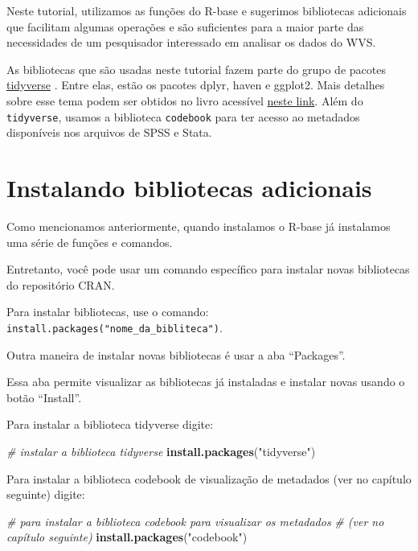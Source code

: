 \documentclass[
  10pt,
  brazil,
  a4paper,
  twoside, notitlepage, openright]{book}
\newenvironment{Shaded}{\begin{snugshade}}{\end{snugshade}}
\newcommand{\CommentTok}[1]{\textcolor[rgb]{0.56,0.35,0.01}{\textit{#1}}}
\newcommand{\KeywordTok}[1]{\textcolor[rgb]{0.13,0.29,0.53}{\textbf{#1}}}
\newcommand{\NormalTok}[1]{#1}
\newcommand{\StringTok}[1]{\textcolor[rgb]{0.31,0.60,0.02}{#1}}
\begin{document}
Neste tutorial, utilizamos as funções do R-base e sugerimos bibliotecas adicionais que facilitam algumas operações e são suficientes para a maior parte das necessidades de um pesquisador interessado em analisar os dados do WVS.

As bibliotecas que são usadas neste tutorial fazem parte do grupo de pacotes \href{https://www.tidyverse.org/}{tidyverse} \citeyearpar{R-tidyverse}. Entre elas, estão os pacotes dplyr, haven e ggplot2. Mais detalhes sobre esse tema podem ser obtidos no livro acessível \href{https://r4ds.had.co.nz/}{neste link}. Além do \texttt{tidyverse}, usamos a biblioteca \texttt{codebook} para ter acesso ao metadados disponíveis nos arquivos de SPSS e Stata.

\hypertarget{instalando-bibliotecas-adicionais}{%
\section{Instalando bibliotecas adicionais}\label{instalando-bibliotecas-adicionais}}

Como mencionamos anteriormente, quando instalamos o R-base já instalamos uma série de funções e comandos.

Entretanto, você pode usar um comando específico para instalar novas bibliotecas do repositório CRAN.

Para instalar bibliotecas, use o comando: \texttt{install.packages("nome\_da\_bibliteca")}.

Outra maneira de instalar novas bibliotecas é usar a aba ``Packages''.

Essa aba permite visualizar as bibliotecas já instaladas e instalar novas usando o botão ``Install''.

Para instalar a biblioteca tidyverse digite:

\begin{Shaded}
\begin{Highlighting}[]
\CommentTok{# instalar a biblioteca tidyverse}
\KeywordTok{install.packages}\NormalTok{(}\StringTok{"tidyverse"}\NormalTok{)}
\end{Highlighting}
\end{Shaded}

Para instalar a biblioteca codebook de visualização de metadados (ver no capítulo seguinte) digite:

\begin{Shaded}
\begin{Highlighting}[]
\CommentTok{# para instalar a biblioteca codebook para visualizar os metadados }
\CommentTok{# (ver no capítulo seguinte)}
\KeywordTok{install.packages}\NormalTok{(}\StringTok{"codebook"}\NormalTok{)}
\end{Highlighting}
\end{Shaded}
\end{document}
